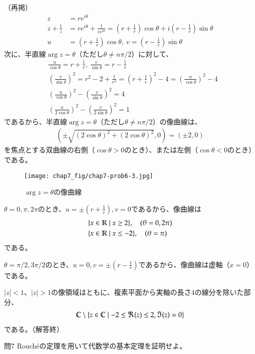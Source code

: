 \newpage
（再掲）
\begin{align*}
    z&=re^{i\theta}\\
    z+\frac{1}{z}&=re^{i\theta}+\frac{1}{re^{i\theta}}
    =\left(r+\frac{1}{r}\right)\cos\theta+i\left(r-\frac{1}{r}\right)\sin\theta\\
    u&=\left(r+\frac{1}{r}\right)\cos\theta,\ v=\left(r-\frac{1}{r}\right)\sin\theta
\end{align*}
次に、半直線$\arg z=\theta$（ただし$\theta\neq n\pi/2$）に対して、
\begin{align*}
    &\frac{u}{\cos\theta}=r+\frac{1}{r},
    \ \frac{v}{\sin\theta}=r-\frac{1}{r}\\
    &\left(\frac{v}{\sin\theta}\right)^2
    =r^2-2+\frac{1}{r^2}
    =\left(r+\frac{1}{r}\right)^2-4
    =\left(\frac{u}{\cos\theta}\right)^2-4\\
    &\left(\frac{u}{\cos\theta}\right)^2-\left(\frac{v}{\sin\theta}\right)^2=4\\
    &\left(\frac{u}{2\cos\theta}\right)^2-\left(\frac{v}{2\sin\theta}\right)^2=1
\end{align*}
であるから、半直線$\arg z=\theta$（ただし$\theta\neq n\pi/2$）の像曲線は、
\begin{align*}
(\pm\sqrt{(2\cos\theta)^2+(2\cos\theta)^2},0)=(\pm2,0)   
\end{align*}
を焦点とする双曲線の右側（$\cos\theta>0$のとき）、または左側（$\cos\theta<0$のとき）である。
\begin{figure}[h]
    \centering
    \texttt{[image: chap7\_fig/chap7-prob6-3.jpg]}
    \caption{$\arg z=\theta$の像曲線}
    \label{fig:hyperbola}
\end{figure}

$\theta=0,\pi,2\pi$のとき、$u=\pm\left(r+\frac{1}{r}\right),v=0$であるから、像曲線は
\begin{align*}
    &\{x\in\mathbb{R}\mid x\ge2\},\quad(\theta=0,2\pi)\\
    &\{x\in\mathbb{R}\mid x\le -2\},\quad(\theta=\pi)
\end{align*}
である。

$\theta=\pi/2,3\pi/2$のとき、$u=0,v=\pm\left(r-\frac{1}{r}\right)$であるから、像曲線は虚軸（$x=0$）である。


$|z|<1$、$|z|>1$の像領域はともに、複素平面から実軸の長さ4の線分を除いた部分、
\begin{align*}
    \mathbb{C}\setminus\{z\in\mathbb{C}\mid -2\le \Re(z)\le2,\Im(z)=0\}
\end{align*}
である。（解答終）

\newpage
\begin{mysimplebox}{問7}
    Rouch\'{e}の定理を用いて代数学の基本定理を証明せよ。
\end{mysimplebox}

